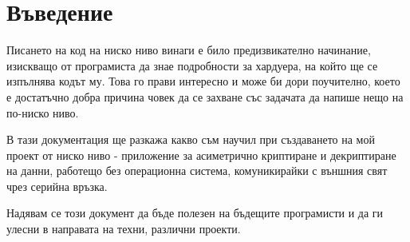 \section*{Въведение}
Писането на код на ниско ниво винаги е било предизвикателно начинание, изискващо от програмиста да знае подробности за хардуера, на който ще се изпълнява кодът му. Това го прави интересно и може би дори поучително, което е достатъчно добра причина човек да се захване със задачата да напише нещо на по-ниско ниво.

В тази документация ще разкажа какво съм научил при създаването на мой проект от ниско ниво - приложение за асиметрично криптиране и декриптиране на данни, работещо без операционна система, комуникирайки с външния свят чрез серийна връзка.

Надявам се този документ да бъде полезен на бъдещите програмисти и да ги улесни в направата на техни, различни проекти.
